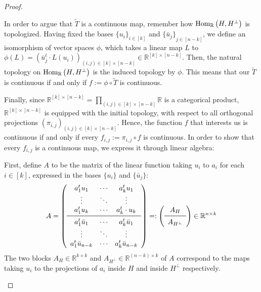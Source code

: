 \begin{proof}
\begin{b_item}
In order to argue that $\tilde T$ is a continuous map, remember how $\mathrm{Hom}_{\mathbb{R}}\left(H,H^{\perp}\right)$ is topologized.
Having fixed the bases ${\{u_i\}}_{i\in[k]}$ and ${\{\bar{u}_j\}}_{j\in[n-k]}$, we define an isomorphism of vector spaces $\phi$, which takes a linear map $L$ to
$\phi(L)={\left(\bar{u}_j^t\cdot L(u_i)\right)}_{(i,j)\in[k]\times[n-k]}\in\mathbb{R}^{[k]\times[n-k]}$.
Then, the natural topology on $\mathrm{Hom}_{\mathbb{R}}\left(H,H^{\perp}\right)$ is the induced topology by $\phi$. This means that our $\tilde T$ is continuous if and only if $f:=\phi\circ\tilde T$ is continuous.

Finally, since $\mathbb{R}^{[k]\times[n-k]}=\prod_{(i,j)\in[k]\times[n-k]}\mathbb{R}$ is a categorical product, $\mathbb{R}^{[k]\times[n-k]}$ is equipped with the initial topology, with respect to all orthogonal projections ${\left(\pi_{i,j}\right)}_{(i,j)\in[k]\times[n-k]}$. Hence, the function $f$ that interests us is continuous if and only if every $f_{i,j}:=\pi_{i,j}\circ f$ is continuous. In order to show that every $f_{i,j}$ is a continuous map, we express it through linear algebra:

First, define $A$ to be the matrix of the linear function taking $u_i$ to $a_i$ for each $i\in[k]$, expressed in the bases $\{u_i\}$ and $\{\bar{u}_j\}$:
\[A=\left(\begin{array}{ccc}
a^t_1u_1&\cdots&a^t_ku_1\\
\vdots&\ddots&\vdots\\
a^t_1u_k&\cdots&a^t_k\cdot u_k\\
\midrule
a^t_1\bar{u}_1&\cdots&a^t_k\bar{u}_1\\
\vdots&\ddots&\vdots\\
a^t_1\bar{u}_{n-k}&\cdots&a^t_k\bar{u}_{n-k}\\
\end{array}\right)=:
\left(\begin{array}{c}A_H\\\midrule A_{H^{\perp}}\\
\end{array}\right)
\in\mathbb{R}^{n\times{k}}\]
The two blocks $A_H\in\mathbb{R}^{k\times k}$ and $A_{H^{\perp}}\in\mathbb{R}^{(n-k)\times k}$ of $A$ correspond to the maps taking $u_i$ to the projections of $a_i$ inside $H$ and inside $H^{\perp}$ respectively.


\end{b_item}
\end{proof}
